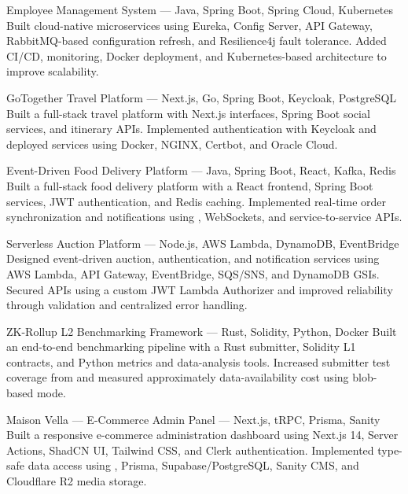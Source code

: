 \vspace{0.45em}

\cvprojectfull
{Employee Management System --- Java, Spring Boot, Spring Cloud, Kubernetes}
{}
{Built cloud-native  microservices using Eureka, Config Server, API Gateway, RabbitMQ-based configuration refresh, and Resilience4j fault tolerance.}
{Added CI/CD, monitoring, Docker deployment, and Kubernetes-based architecture to improve scalability.}

\vspace{0.45em}

\cvprojectfull
{GoTogether Travel Platform --- Next.js, Go, Spring Boot, Keycloak, PostgreSQL}
{}
{Built a full-stack travel platform with Next.js interfaces, Spring Boot social services, and  itinerary APIs.}
{Implemented  authentication with Keycloak and deployed services using Docker, NGINX, Certbot, and Oracle Cloud.}

\vspace{0.45em}

\cvprojectfull
{Event-Driven Food Delivery Platform --- Java, Spring Boot, React, Kafka, Redis}
{}
{Built a full-stack food delivery platform with a React frontend, Spring Boot services, JWT authentication, and Redis caching.}
{Implemented real-time order synchronization and notifications using , WebSockets, and service-to-service APIs.}

\vspace{0.45em}

\cvprojectfull
{Serverless Auction Platform --- Node.js, AWS Lambda, DynamoDB, EventBridge}
{}
{Designed event-driven auction, authentication, and notification services using AWS Lambda, API Gateway, EventBridge, SQS/SNS, and DynamoDB GSIs.}
{Secured APIs using a custom JWT Lambda Authorizer and improved reliability through validation and centralized error handling.}

\vspace{0.45em}

\cvprojectfull
{ZK-Rollup L2 Benchmarking Framework --- Rust, Solidity, Python, Docker}
{}
{Built an end-to-end benchmarking pipeline with a Rust submitter, Solidity L1 contracts, and Python metrics and data-analysis tools.}
{Increased submitter test coverage from  and measured approximately  data-availability cost using blob-based mode.}

\vspace{0.45em}

\cvprojectfull
{Maison Vella --- E-Commerce Admin Panel --- Next.js, tRPC, Prisma, Sanity}
{}
{Built a responsive e-commerce administration dashboard using Next.js 14, Server Actions, ShadCN UI, Tailwind CSS, and Clerk authentication.}
{Implemented type-safe data access using , Prisma, Supabase/PostgreSQL, Sanity CMS, and Cloudflare R2 media storage.}